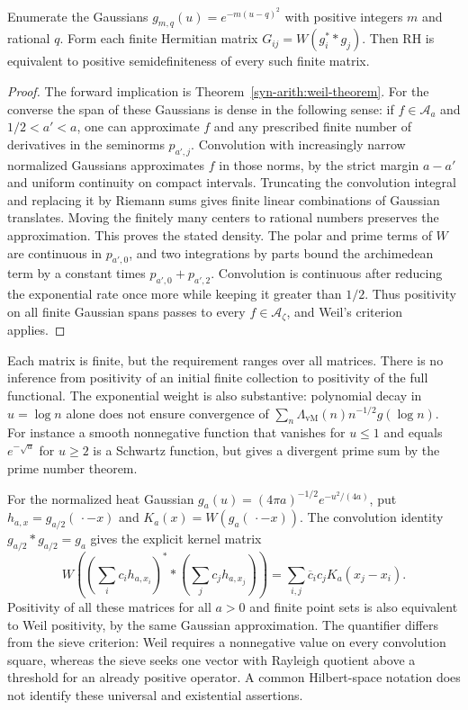 \begin{proposition}
\label{syn-arith:gram-tests}
Enumerate the Gaussians $g_{m,q}(u)=e^{-m(u-q)^2}$ with positive integers $m$
and rational $q$.  Form each finite Hermitian matrix
$G_{ij}=W(g_i^**g_j)$.  Then RH is equivalent to positive semidefiniteness
of every such finite matrix.
\end{proposition}
\begin{proof}
The forward implication is Theorem~\ref{syn-arith:weil-theorem}.
For the converse the span of these Gaussians is dense in the following
sense: if $f\in\mathcal A_a$ and $1/2<a'<a$, one can approximate $f$ and
any prescribed finite number of derivatives in the seminorms $p_{a',j}$.
Convolution with increasingly narrow normalized Gaussians approximates $f$
in those norms, by the strict margin $a-a'$ and uniform continuity on
compact intervals.  Truncating the convolution integral and replacing it
by Riemann sums gives finite linear combinations of Gaussian translates.
Moving the finitely many centers to rational numbers preserves the
approximation.  This proves the stated density.
The polar and prime terms of $W$ are continuous in $p_{a',0}$, and two
integrations by parts bound the archimedean term by a constant times
$p_{a',0}+p_{a',2}$.  Convolution is continuous after reducing the exponential
rate once more while keeping it greater than $1/2$.
Thus positivity on all finite Gaussian spans passes to every $f\in
\mathcal A_\zeta$, and Weil's criterion applies.
\end{proof}

Each matrix is finite, but the requirement ranges over all matrices.
There is no inference from positivity of an initial finite collection to
positivity of the full functional.  The exponential weight is also
substantive: polynomial decay in $u=\log n$ alone does not ensure convergence
of $\sum_n\Lambda_{\mathrm{vM}}(n)n^{-1/2}g(\log n)$.
For instance a smooth nonnegative function that vanishes for $u\leq1$
and equals $e^{-\sqrt u}$ for $u\geq2$ is a Schwartz function, but gives
a divergent prime sum by the prime number theorem.

For the normalized heat Gaussian $g_a(u)=(4\pi a)^{-1/2}e^{-u^2/(4a)}$,
put $h_{a,x}=g_{a/2}(\,\cdot-x)$ and $K_a(x)=W(g_a(\,\cdot-x))$.
The convolution identity $g_{a/2}*g_{a/2}=g_a$ gives the explicit kernel
matrix
\[
 W\left(\left(\sum_ic_ih_{a,x_i}\right)^**
             \left(\sum_jc_jh_{a,x_j}\right)\right)
 =\sum_{i,j}\overline c_ic_jK_a(x_j-x_i).
\]
Positivity of all these matrices for all $a>0$ and finite point sets is
also equivalent to Weil positivity, by the same Gaussian approximation.
The quantifier differs from the sieve criterion: Weil requires a
nonnegative value on every convolution square, whereas the sieve seeks
one vector with Rayleigh quotient above a threshold for an already
positive operator.  A common Hilbert-space notation does not identify
these universal and existential assertions.


